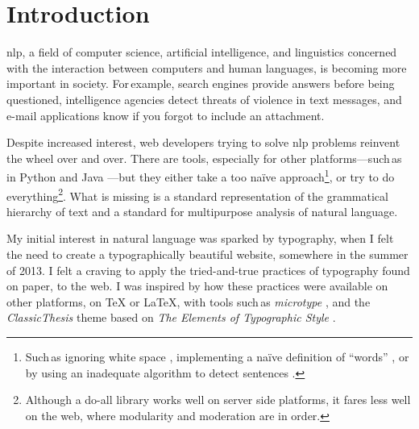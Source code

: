 
\begingroup
\let\clearpage\relax
\let\cleardoublepage\relax
\let\cleardoublepage\relax

\chapter*{Introduction}\label{introduction}

\Gls{nlp}, a field of computer science, artificial intelligence, and
  linguistics concerned with the interaction between computers and human
  languages, is becoming more important in society.
For\,example, search engines provide answers before being questioned,
  intelligence agencies detect threats of violence in text messages, and
  e-mail applications know if you forgot to include an attachment.

Despite increased interest, web developers trying to solve \gls{nlp} problems
  reinvent the wheel over and over.
There are tools, especially for other platforms---such\,as in Python
  \autocite{nltk-source} and Java \autocite{opennlp-source}---but they either
  take a too na\"ive approach\footnote{Such\,as ignoring white space
    \autocite{loadfive/knwl-source-code}, implementing a na\"ive
    definition of ``words'' \autocite{nhunzaker/speakeasy-source-code},
    or by using an inadequate algorithm to detect sentences
    \autocite[][]{nytimes/emphasis-source-code}.}, or try to do
  everything\footnote{Although a do-all library
    \autocite[such\,as][]{NaturalNode/natural-source-code} works well on
    server side platforms, it fares less well on the web, where modularity
    and moderation
  are in order.}.
What is missing is a standard representation of the grammatical hierarchy
  of text and a standard for multipurpose analysis of natural language.

My initial interest in natural language was sparked by typography, when I
  felt the need to create a typographically beautiful website, somewhere in
  the summer of 2013.
I felt a craving to apply the tried-and-true practices of typography found on
  paper, to the web.
I was inspired by how these practices were available on other platforms,
  on \TeX{} or \LaTeX, with tools such\,as \emph{microtype}
  \autocite{microtype}, and the \emph{ClassicThesis} theme
  \autocite{classicthesis} based on \emph{The Elements of Typographic Style}
  \autocite{bringhurst-element-typographic-style}.

